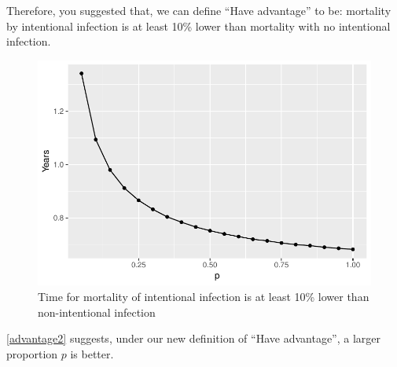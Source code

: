 \documentclass[12pt]{article}
\begin{document}
Therefore, you suggested that, we can define ``Have advantage'' to be: mortality by intentional infection is at least 10\% lower than mortality with no intentional infection.
\begin{figure}[H]
  \caption{Time for mortality of intentional infection is at least 10\% lower than non-intentional infection}
  \centering
  \includegraphics[width=1\textwidth]{Figures/New_time_to_advantage_plot.pdf}
\end{figure}\label{advantage2}
\autoref{advantage2} suggests, under our new definition of ``Have advantage'', a larger proportion $p$ is better.
\end{document}
